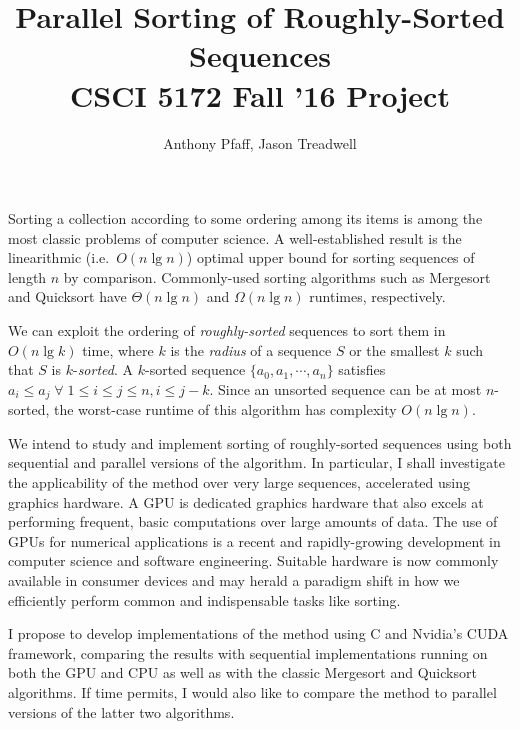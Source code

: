 \documentclass[letterpaper, 12pt]{article}
\title{Parallel Sorting of Roughly-Sorted Sequences\\CSCI 5172 Fall '16 Project}
\author{Anthony Pfaff, Jason Treadwell}
\begin{document}
\maketitle

Sorting a collection according to some ordering among its items is among the most classic problems of computer science.
A well-established result is the linearithmic  (i.e.\ $O(n \lg n)$) optimal upper bound for sorting sequences of length $n$ by
  comparison.
Commonly-used sorting algorithms such as Mergesort and Quicksort have $\Theta(n \lg n)$ and $\Omega(n \lg n)$ runtimes,
  respectively.

We can exploit the ordering of \textit{roughly-sorted} sequences to sort them in $O(n \lg k)$ time, where $k$ is the
  \textit{radius} of a sequence $S$ or the smallest $k$ such that $S$ is $k$-\textit{sorted}.\cite{altman89}
A $k$-sorted sequence $\{a_0, a_1, \cdots, a_n\}$ satisfies $a_i \leq a_j \;\forall\; 1 \leq i \leq j \leq n, i \leq j - k$.
Since an unsorted sequence can be at most $n$-sorted, the worst-case runtime of this algorithm has complexity $O(n \lg n)$.

We intend to study and implement sorting of roughly-sorted sequences using both sequential and parallel\cite{altman90} versions
  of the algorithm. In particular, I shall investigate the applicability of the method over very large sequences,
  accelerated using graphics hardware. A GPU is dedicated graphics hardware that also excels at performing frequent, basic
  computations over large amounts of data. The use of GPUs for numerical applications is a recent and rapidly-growing development
  in computer science and software engineering. Suitable hardware is now commonly available in consumer devices and may herald a
  paradigm shift in how we efficiently perform common and indispensable tasks like sorting.

I propose to develop implementations of the method using C and Nvidia's CUDA framework, comparing the results with sequential
  implementations running on both the GPU and CPU as well as with the classic Mergesort and Quicksort algorithms. If time
  permits, I would also like to compare the method to parallel versions of the latter two algorithms.


\nocite{*}
\end{document}
